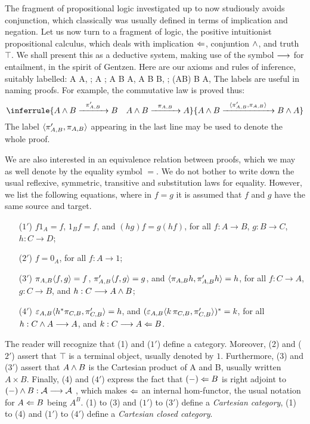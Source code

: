 The fragment of propositional logic investigated up to now studiously avoids
conjunction, which classically was usually defined in terms of implication and negation.
Let us now turn to a fragment of logic, the positive intuitionist propositional calculus,
which deals with implication $\Leftarrow$, conjuntion $\wedge$, and truth $\top$.
We shall present this as a deductive system, making use of the symbol $\longrightarrow$ for entailment,
in the spirit of Gentzen. Here are our axioms and rules of inference, suitably labelled:
\bes
A  A, \qquad {};
\ees
\bes
A  \top;
\ees
\bes
A \sland B \xto{\prAB} A,\,\,A \sland B \xto{\prpAB} B, \quad
{};
\ees
\bes
(A\from B) \sland B  A, \qquad {}
\ees
The labels are useful in naming proofs. For example, the commutative law is proved thus:
$$
\inferrule{A \sland B \xto{\prpAB} B\quad A \sland B \xto{\prAB} A}{A \sland B \xto{\bracket{\prpAB,\prAB}} B\sland A}
$$
The label $\langle \pi'_{A,B},\pi_{A,B} \rangle$ appearing in the last line may be used
to denote the whole proof.

We are also interested in an equivalence relation between proofs,
which we may as well denote by the equality symbol $=$. We do not bother to
write down the usual reflexive, symmetric, transitive and substitution laws for
equality. However, we list the following equations, where in $f = g$ it is
assumed that $f$ and $g$ have the same source and target.
\begin{enumerate}[align=left]
\item[($1'$)]$f1_A = f$, $1_Bf = f$, and $(hg)f = g(hf)$,
 for all $f:A \to B$, $g:B \to C$, $h: C\to D$;
\item[($2'$)] $f= 0_A$, for all $f: A \to 1$;
\item[($3'$)] $\pi_{A,B}\langle f,g \rangle = f$, $\pi'_{A,B}\langle f,g \rangle= g$, and
$\langle\pi_{A,B} h, \pi'_{A,B} h\rangle = h$, for all $f:C \to A$, $g:C \to B$, and $h: C\longrightarrow A\wedge B$;
\item[($4'$)] $\varepsilon_{A,B}\langle h^*\pi_{C,B}, \pi'_{C,B} \rangle = h$, and
$(\varepsilon_{A,B}\langle k\,\pi_{C,B}, \pi'_{C,B} \rangle)^* = k$,
for all $h: C\wedge A \longrightarrow A$, and $k: C \longrightarrow A \Leftarrow B$.
\end{enumerate}
The reader will recognize that (1) and ($1'$) define a category.
Moreover, (2) and ($2'$) assert that $\top$
is a terminal object, usually denoted by $1$.
Furthermore, (3) and ($3'$) assert that $A \wedge B$ is the Cartesian product
of A and B, usually written $A \times B$.
Finally, (4) and ($4'$) express the fact that $(-) \Leftarrow B$ is right adjoint to
$(-) \wedge B: {\cal A} \longrightarrow {\cal A}$ , which makes $\Leftarrow$ an internal hom-functor, the
usual notation for $A \Leftarrow B$ being $A^B$.
(1) to (3) and ($1'$) to ($3'$) define a {\it Cartesian category},
(1) to (4) and ($1'$) to ($4'$) define a {\it Cartesian closed category}.

